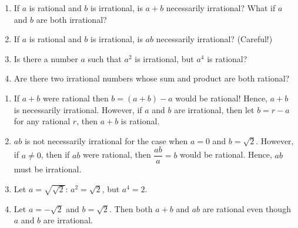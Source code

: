\begin{pr} %
  \begin{enumerate}[label=(\alph*)]
    \item If $a$ is rational and $b$ is irrational, is
    $a + b$ necessarily irrational? What if $a$ and $b$
    are both irrational?
    \item If $a$ is rational and $b$ is irrational,
    is $ab$ necessarily irrational? (Careful!)
    \item Is there a number $a$ such that $a^2$ is irrational,
    but $a^4$ is rational?
    \item Are there two irrational numbers whose sum and
    product are both rational?
  \end{enumerate}
\end{pr}

\begin{solution} %
  \begin{enumerate}[label=(\alph*)]
    \item If $a+b$ were rational then
    $b = (a+b) - a$ would be rational! Hence,
    $a+b$ is necessarily irrational. However,
    if $a$ and $b$ are irrational, then let $b = r - a$ for
    any rational $r$, then $a+b$ is rational.
    \item $ab$ is not necessarily irrational for the case
    when $a = 0$ and $b = \sqrt{2}$. However, if $a \neq 0$,
    then if $ab$ were rational, then $\dfrac{ab}{a} = b$
    would be rational. Hence, $ab$ must be irrational.
    \item Let $a = \sqrt{\sqrt{2}}$: $a^2 = \sqrt{2}$, but
    $a^4 = 2$.
    \item Let $a = -\sqrt{2}$ and $b = \sqrt{2}$. Then
    both $a+b$ and $ab$ are rational even though $a$
    and $b$ are irrational.
  \end{enumerate}
\end{solution}
